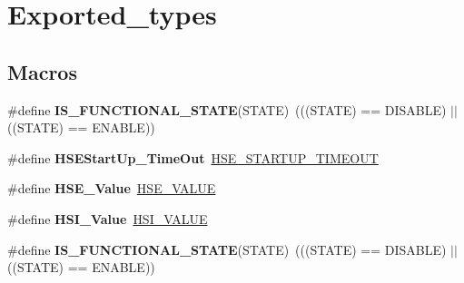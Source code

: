 \hypertarget{group___exported__types}{\section{Exported\-\_\-types}
\label{group___exported__types}
}
\subsection*{Macros}
\begin{DoxyCompactItemize}
\item 
\hypertarget{group___exported__types_gaffaf7c3f537d7a3370b1bbdda67a2bf6}{\#define {\bfseries I\-S\-\_\-\-F\-U\-N\-C\-T\-I\-O\-N\-A\-L\-\_\-\-S\-T\-A\-T\-E}(S\-T\-A\-T\-E)~(((S\-T\-A\-T\-E) == D\-I\-S\-A\-B\-L\-E) $\vert$$\vert$ ((S\-T\-A\-T\-E) == E\-N\-A\-B\-L\-E))}\label{group___exported__types_gaffaf7c3f537d7a3370b1bbdda67a2bf6}

\item 
\hypertarget{group___exported__types_ga7e69dacd5c3b950b5b1786d7336b30d3}{\#define {\bfseries H\-S\-E\-Start\-Up\-\_\-\-Time\-Out}~\hyperlink{group___library__configuration__section_ga68ecbc9b0a1a40a1ec9d18d5e9747c4f}{H\-S\-E\-\_\-\-S\-T\-A\-R\-T\-U\-P\-\_\-\-T\-I\-M\-E\-O\-U\-T}}\label{group___exported__types_ga7e69dacd5c3b950b5b1786d7336b30d3}

\item 
\hypertarget{group___exported__types_gab12a1abe6dd0001e7a0487a8b175b28c}{\#define {\bfseries H\-S\-E\-\_\-\-Value}~\hyperlink{group___library__configuration__section_gaeafcff4f57440c60e64812dddd13e7cb}{H\-S\-E\-\_\-\-V\-A\-L\-U\-E}}\label{group___exported__types_gab12a1abe6dd0001e7a0487a8b175b28c}

\item 
\hypertarget{group___exported__types_ga5718ca1fe0825cdbebb466886cfb5016}{\#define {\bfseries H\-S\-I\-\_\-\-Value}~\hyperlink{group___library__configuration__section_gaaa8c76e274d0f6dd2cefb5d0b17fbc37}{H\-S\-I\-\_\-\-V\-A\-L\-U\-E}}\label{group___exported__types_ga5718ca1fe0825cdbebb466886cfb5016}

\item 
\hypertarget{group___exported__types_gaffaf7c3f537d7a3370b1bbdda67a2bf6}{\#define {\bfseries I\-S\-\_\-\-F\-U\-N\-C\-T\-I\-O\-N\-A\-L\-\_\-\-S\-T\-A\-T\-E}(S\-T\-A\-T\-E)~(((S\-T\-A\-T\-E) == D\-I\-S\-A\-B\-L\-E) $\vert$$\vert$ ((S\-T\-A\-T\-E) == E\-N\-A\-B\-L\-E))}\label{group___exported__types_gaffaf7c3f537d7a3370b1bbdda67a2bf6}


\end{DoxyCompactItemize}
